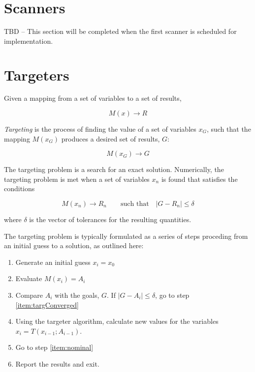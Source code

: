 \section{Scanners}

TBD -- This section will be completed when the first scanner is scheduled for implementation.

\section{Targeters}

Given a mapping from a set of variables to a set of results,

\begin{equation}\label{eq:vargoalmap}
M(x)\longrightarrow R
\end{equation}

\noindent \textit{Targeting} is the process of finding the value of a set of variables $x_G$, such
that the mapping $M(x_G)$ produces a desired set of results, $G$:

\begin{equation}\label{eq:targeting}
M(x_G) \longrightarrow G
\end{equation}

\noindent The targeting problem is a search for an exact solution.  Numerically, the targeting
problem is met when a set of variables $x_n$ is found that satisfies the conditions

\begin{equation}
M(x_n) \longrightarrow R_n \quad\quad\text{such that}\quad\vert G - R_n\vert \leq \delta
\end{equation}

\noindent where $\delta$ is the vector of tolerances for the resulting quantities.

The targeting problem is typically formulated as a series of steps proceding from an initial guess
to a solution, as outlined here:

\begin{enumerate}
   \item Generate an initial guess $x_i = x_0$
   \item\label{item:nominal} Evaluate $M(x_i) = A_i$
   \item Compare $A_i$ with the goals, $G$.  If $\vert G - A_i\vert  \leq \delta$, go to step
\ref{item:targConverged}
   \item Using the targeter algorithm, calculate new values for the variables $x_i = T(x_{i-1};
A_{i-1})$.
   \item Go to step \ref{item:nominal}
   \item\label{item:targConverged} Report the results and exit.
\end{enumerate}

